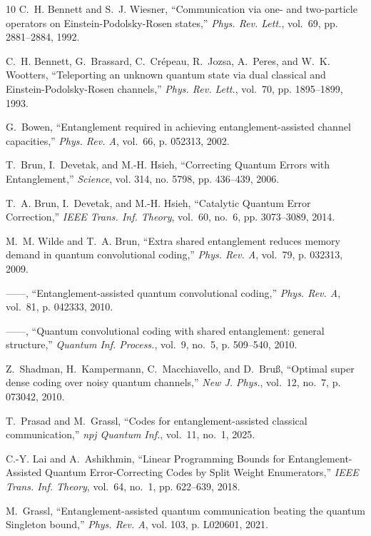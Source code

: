 \documentclass[]{amsart}
\begin{document}
\begin{thebibliography}{10}
C.~H. Bennett and S.~J. Wiesner, ``{Communication via one- and two-particle operators on Einstein-Podolsky-Rosen states},'' \emph{Phys. Rev. Lett.}, vol.~69, pp. 2881--2884, 1992.

C.~H. Bennett, G.~Brassard, C.~Cr\'epeau, R.~Jozsa, A.~Peres, and W.~K. Wootters, ``{Teleporting an unknown quantum state via dual classical and Einstein-Podolsky-Rosen channels},'' \emph{Phys. Rev. Lett.}, vol.~70, pp. 1895--1899, 1993.

G.~Bowen, ``{Entanglement required in achieving entanglement-assisted channel capacities},'' \emph{Phys. Rev. A}, vol.~66, p. 052313, 2002.

T.~Brun, I.~Devetak, and M.-H. Hsieh, ``{Correcting Quantum Errors with Entanglement},'' \emph{Science}, vol. 314, no. 5798, pp. 436--439, 2006.

T.~A. Brun, I.~Devetak, and M.-H. Hsieh, ``{Catalytic Quantum Error Correction},'' \emph{IEEE Trans. Inf. Theory}, vol.~60, no.~6, pp. 3073--3089, 2014.

M.~M. Wilde and T.~A. Brun, ``{Extra shared entanglement reduces memory demand in quantum convolutional coding},'' \emph{Phys. Rev. A}, vol.~79, p. 032313, 2009.

------, ``{Entanglement-assisted quantum convolutional coding},'' \emph{Phys. Rev. A}, vol.~81, p. 042333, 2010.

------, ``{Quantum convolutional coding with shared entanglement: general structure},'' \emph{Quantum Inf. Process.}, vol.~9, no.~5, p. 509–540, 2010.

Z.~Shadman, H.~Kampermann, C.~Macchiavello, and D.~Bruß, ``{Optimal super dense coding over noisy quantum channels},'' \emph{New J. Phys.}, vol.~12, no.~7, p. 073042, 2010.

T.~Prasad and M.~Grassl, ``{Codes for entanglement-assisted classical communication},'' \emph{npj Quantum Inf.}, vol.~11, no.~1, 2025.

C.-Y. Lai and A.~Ashikhmin, ``{Linear Programming Bounds for Entanglement-Assisted Quantum Error-Correcting Codes by Split Weight Enumerators},'' \emph{IEEE Trans. Inf. Theory}, vol.~64, no.~1, pp. 622--639, 2018.

M.~Grassl, ``{Entanglement-assisted quantum communication beating the quantum Singleton bound},'' \emph{Phys. Rev. A}, vol. 103, p. L020601, 2021.


\end{thebibliography}
\end{document}
